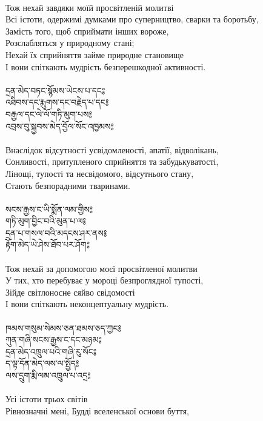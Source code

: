 \\
Тож нехай завдяки моїй просвітленій молитві \\
Всі істоти, одержимі думками про суперництво, сварки та боротьбу, \\
Замість того, щоб сприймати інших вороже, \\
Розслабляться у природному стані; \\
Нехай їх сприйняття займе природне становище \\
І вони спіткають мудрість безперешкодної активності. \\
\\
\newpage
{\ti
དྲན་མེད་བཏང་སྙོམས་ཡེངས་པ་དང༔ \\
འཐིབས་དང་རྨུགས་དང་བརྗེད་པ་དང༔ \\
བརྒྱལ་དང་ལེ་ལོ་གཏི་མུག་པས༔ \\
འབྲས་བུ་སྐྱབས་མེད་བྱོལ་སོང་འཁྱམས༔}\\
\\
Внаслідок відсутності усвідомленості, апатії, відволікань, \\
Сонливості, притупленого сприйняття та забудькуватості, \\
Лінощі, тупості та несвідомого, відсутнього стану, \\
Стають безпорадними тваринами. \\
\\
{\ti
སངས་རྒྱས་ང་ཡི་སྨོན་ལམ་གྱིས༔ \\
གཏི་མུག་བྱིང་བའི་མུན་པ་ལ༔ \\
དྲན་པ་གསལ་བའི་མདངས་ཤར་ནས༔ \\
རྟོག་མེད་ཡེ་ཤེས་ཐོབ་པར་ཤོག༔}\\
\\
Тож нехай за допомогою моєї просвітленої молитви \\
У тих, хто перебуває у мороці безпроглядної тупості, \\
Зійде світлоносне сяйво свідомості \\
І вони спіткають неконцептуальну мудрість. \\
\\
\newpage
{\ti
ཁམས་གསུམ་སེམས་ཅན་ཐམས་ཅད་ཀྱང༔ \\
ཀུན་གཞི་སངས་རྒྱས་ང་དང་མཉམ༔ \\
དྲན་མེད་འཁྲུལ་པའི་གཞི་རུ་སོང༔ \\
ད་ལྟ་དོན་མེད་ལས་ལ་སྤྱོད༔\\
ལས་དྲུག་རྨི་ལམ་འཁྲུལ་པ་འདྲ༔}\\
\\
Усі істоти трьох світів \\
Рівнозначні мені, Будді вселенської основи буття, \\
